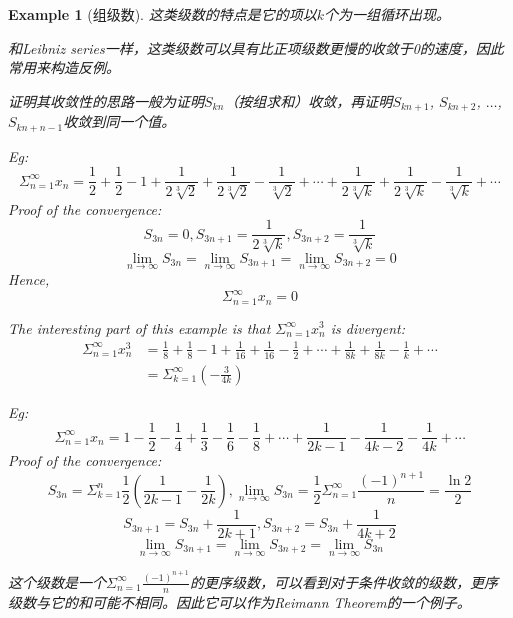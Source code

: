 \documentclass[onecolumn]{ctexart}
\newtheorem{example}{Example}
\begin{document}
\begin{example}[组级数]
  这类级数的特点是它的项以$k$个为一组循环出现。

  和Leibniz series一样，这类级数可以具有比正项级数更慢的收敛于0的速度，因此常用来构造反例。

  证明其收敛性的思路一般为证明$S_{kn}$（按组求和）收敛，再证明$S_{kn+1}$, $S_{kn+2}$, $\ldots$, $S_{kn+n-1}$收敛到同一个值。

  Eg:
  \[
    \Sigma_{n=1}^{\infty} x_n = \frac{1}{2} + \frac{1}{2} - 1 + \frac{1}{2\sqrt[3]{2}} + \frac{1}{2\sqrt[3]{2}} - \frac{1}{\sqrt[3]{2}} + \cdots + \frac{1}{2\sqrt[3]{k}} + \frac{1}{2\sqrt[3]{k}} - \frac{1}{\sqrt[3]{k}} + \cdots
  \]
  Proof of the convergence:
  \[
    S_{3n} = 0, S_{3n+1} = \frac{1}{2\sqrt[3]{k}}, S_{3n+2} = \frac{1}{\sqrt[3]{k}}
  \]
  \[
    \lim_{n \to \infty} S_{3n} = \lim_{n \to \infty} S_{3n+1} = \lim_{n \to \infty} S_{3n+2} = 0
  \]
  Hence,
  \[
    \Sigma_{n=1}^{\infty} x_n = 0
  \]

  The interesting part of this example is that $\Sigma_{n=1}^{\infty} x_n^3$ is divergent:
  \[
    \begin{split}
      \Sigma_{n=1}^{\infty} x_n^3 &= \frac{1}{8} + \frac{1}{8} - 1 + \frac{1}{16} + \frac{1}{16} - \frac{1}{2} + \cdots + \frac{1}{8k} + \frac{1}{8k} - \frac{1}{k} + \cdots \\
                                  &= \Sigma_{k=1}^{\infty} (-\frac{3}{4k})
    \end{split}
  \]


  Eg:
  \[
    \Sigma_{n=1}^{\infty} x_n = 1 - \frac{1}{2} - \frac{1}{4} + \frac{1}{3} - \frac{1}{6} - \frac{1}{8} + \cdots + \frac{1}{2k - 1} - \frac{1}{4k - 2} - \frac{1}{4k} + \cdots
  \]
  Proof of the convergence:
  \[
    S_{3n} = \Sigma_{k=1}^n \frac{1}{2}(\frac{1}{2k-1} - \frac{1}{2k}), \lim_{n \to \infty} S_{3n} = \frac{1}{2} \Sigma_{n=1}^{\infty} \frac{(-1)^{n+1}}{n} = \frac{\ln2}{2}
  \]
  \[
    S_{3n+1} = S_{3n} + \frac{1}{2k+1}, S_{3n+2} = S_{3n} + \frac{1}{4k+2}
  \]
  \[
    \lim_{n \to \infty} S_{3n+1} = \lim_{n \to \infty} S_{3n+2} = \lim_{n \to \infty} S_{3n} 
  \]

  这个级数是一个$\Sigma_{n=1}^{\infty} \frac{(-1)^{n+1}}{n}$的更序级数，可以看到对于条件收敛的级数，更序级数与它的和可能不相同。因此它可以作为Reimann Theorem的一个例子。
\end{example}
\end{document}
